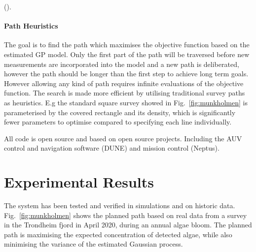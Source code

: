 \documentclass[conference]{IEEEtran}
\newcommand{\cmt}[1]{{\color{red}{#1}}}
\begin{document}
(\cmt{This is very abrupt. You want to say where the GP is being used,
  but after you talk about the plan-exec, since it is the plan-exec
  component which determines when to activate the GP and modify the
  kernel. There should be a nice flow between when you introduce the
  GP with the rest of the para's below. And after Plan/Exec.}).

\paragraph{Path Heuristics}

The goal is to find the path which maximises the objective function
based on the estimated GP model.  Only the first part of the path will
be traversed before new measurements are incorporated into the model
and a new path is deliberated, however the path should be longer than
the first step to achieve long term goals.  However allowing any kind
of path requires infinite evaluations of the objective function.  The
search is made more efficient by utilising traditional survey paths as
heuristics. E.g the standard square survey showed in
Fig.~\ref{fig:munkholmen} is parameterised by the covered rectangle
and its density, which is significantly fewer parameters to optimise
compared to specifying each line individually.

All code is open source and based on open source projects. Including
the AUV control and navigation software (DUNE) and mission control
(Neptus)\cite{pinto2013lsts}.

\section{Experimental Results}

The system has been tested and verified in simulations and on historic
data. Fig.~\ref{fig:munkholmen} shows the planned path based on real
data from a survey in the Trondheim fjord in April 2020, during an
annual algae bloom. The planned path is maximising the expected
concentration of detected algae, while also minimising the variance of
the estimated Gaussian process.
\end{document}
